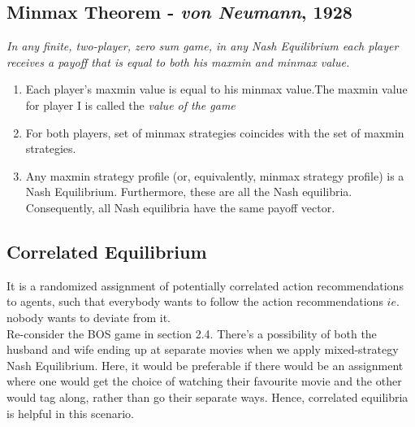 \subsection{Minmax Theorem - \textit{von Neumann}, 1928}
\textit{In any finite, two-player, zero sum game, in any Nash Equilibrium each player receives a payoff that is equal to both his maxmin and minmax value.}
\begin{enumerate}
\item Each player's maxmin value is equal to his minmax value.The maxmin value for player I is called the \textit{value of the game}
\item For both players, set of minmax strategies coincides with the set of maxmin strategies.
\item Any maxmin strategy profile (or, equivalently, minmax strategy profile) is a Nash Equilibrium. Furthermore, these are all the Nash equilibria. Consequently, all Nash equilibria have the same payoff vector.
\end{enumerate}
\subsection{Correlated Equilibrium}
It is a randomized assignment of potentially correlated action recommendations to agents, such that everybody wants to follow the action recommendations $ie.$ nobody wants to deviate from it.\\

Re-consider the BOS game in section 2.4. There's a possibility of both the husband and wife ending up at separate movies when we apply mixed-strategy Nash Equilibrium. Here, it would be preferable if there would be an assignment where one would get  the choice of watching their favourite movie and the other would tag along, rather than go their separate ways. Hence, correlated equilibria is helpful in this scenario.